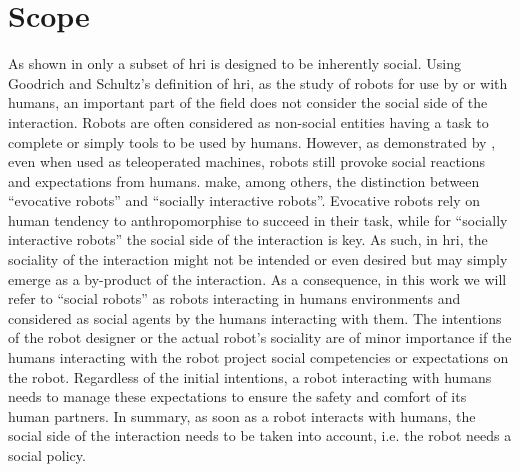 
%
%
%

\section{Scope}\label{sec:intro_scope}

As shown in \cite{goodrich2007human} only a subset of \gls{hri} is designed to be inherently social. Using Goodrich and Schultz's definition of \gls{hri}, as the study of robots for use by or with humans, an important part of the field does not consider the social side of the interaction. Robots are often considered as non-social entities having a task to complete or simply tools to be used by humans. However, as demonstrated by \cite{fincannon2004evidence}, even when used as teleoperated machines, robots still provoke social reactions and expectations from humans. \cite{fong2003survey} make, among others, the distinction between ``evocative robots'' and ``socially interactive robots''. Evocative robots rely on human tendency to anthropomorphise to succeed in their task, while for ``socially interactive robots'' the social side of the interaction is key. As such, in \gls{hri}, the sociality of the interaction might not be intended or even desired but may simply emerge as a by-product of the interaction. As a consequence, in this work we will refer to ``social robots'' as robots interacting in humans environments and considered as social agents by the humans interacting with them. The intentions of the robot designer or the actual robot's sociality are of minor importance if the humans interacting with the robot project social competencies or expectations on the robot. Regardless of the initial intentions, a robot interacting with humans needs to manage these expectations to ensure the safety and comfort of its human partners. In summary, as soon as a robot interacts with humans, the social side of the interaction needs to be taken into account, i.e. the robot needs a social policy. 

